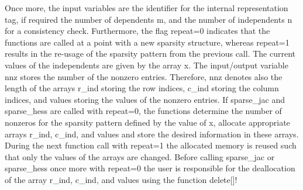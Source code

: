 \documentclass[11pt,twoside]{article}
\begin{document}
%
Once more, the input variables are the identifier for the internal
representation {\sf tag}, if required the number of dependents {\sf m},
and the number of independents {\sf n} for a consistency check. 
Furthermore, the flag {\sf repeat=0} indicates that the functions are called
at a point with a new sparsity structure, whereas  {\sf repeat=1} results in
the re-usage of the sparsity pattern from the previous call.
The current values of the independents are given by the array {\sf x}.
The input/output
variable {\sf nnz} stores the number of the nonzero entries.
Therefore, {\sf nnz} denotes also the length of the arrays {\sf r\_ind} storing
the row indices, {\sf c\_ind} storing the column indices, and
{\sf values} storing the values of the nonzero entries. 
If {\sf sparse\_jac} and {\sf sparse\_hess} are called with {\sf repeat=0},
the functions determine the number of nonzeros for the sparsity pattern 
defined by the value of {\sf x}, allocate appropriate arrays {\sf r\_ind},
{\sf c\_ind}, and {\sf values} and store the desired information in these
arrays.
During the next function call with {\sf repeat=1} the allocated memory
is reused such that only the values of the arrays are changed.   
Before calling {\sf sparse\_jac} or {\sf sparse\_hess} once more with {\sf
  repeat=0} the user is responsible for the deallocation of the array 
 {\sf r\_ind}, {\sf c\_ind}, and {\sf values} using the function {\sf
   delete[]}!
\end{document}
